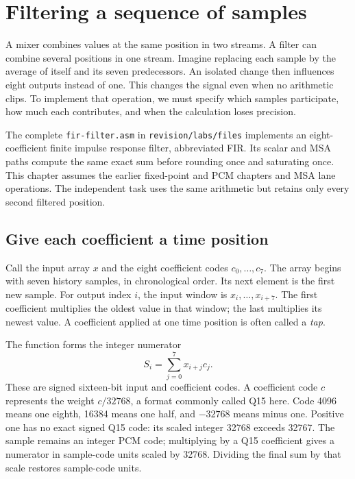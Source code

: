 \chapter{Filtering a sequence of samples}
\label{revision:filtering}

A mixer combines values at the same position in two streams. A filter can combine
several positions in one stream. Imagine replacing each sample by the average of
itself and its seven predecessors. An isolated change then influences eight
outputs instead of one. This changes the signal even when no arithmetic clips.
To implement that operation, we must specify which samples participate, how much
each contributes, and when the calculation loses precision.

The complete \texttt{fir-filter.asm} in \texttt{revision/labs/files} implements an
eight-coefficient finite impulse response filter, abbreviated FIR. Its scalar and
MSA paths compute the same exact sum before rounding once and saturating once.
This chapter assumes the earlier fixed-point and PCM chapters and MSA lane
operations. The independent task uses the same arithmetic but retains only every
second filtered position.

\section{Give each coefficient a time position}

Call the input array $x$ and the eight coefficient codes $c_0,\ldots,c_7$. The
array begins with seven history samples, in chronological order. Its next element
is the first new sample. For output index $i$, the input window is
$x_i,\ldots,x_{i+7}$. The first coefficient multiplies the oldest value in that
window; the last multiplies its newest value. A coefficient applied at one time
position is often called a \emph{tap}.

The function forms the integer numerator
\[
  S_i=\sum_{j=0}^{7}x_{i+j}c_j.
\]
These are signed sixteen-bit input and coefficient codes. A coefficient code $c$
represents the weight $c/32768$, a format commonly called Q15 here. Code 4096
means one eighth, 16384 means one half, and $-32768$ means minus one. Positive
one has no exact signed Q15 code: its scaled integer 32768 exceeds 32767.
The sample remains an integer PCM code; multiplying by a Q15 coefficient gives a
numerator in sample-code units scaled by 32768. Dividing the final sum by that
scale restores sample-code units.

